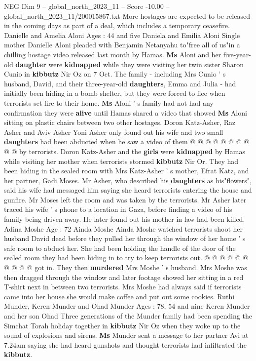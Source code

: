 \begin{textsample}{NEG Dim 9 – global\_north\_2023\_11 – Score -10.00 – global\_north\_2023\_11/200015867.txt}  \label{ex:f9_neg_064}
More hostages are expected to be released in the coming days as part of a deal, which includes a temporary ceasefire.
Danielle and Amelia Aloni Ages : 44 and five Daniela and Emilia Aloni Single mother Danielle Aloni pleaded with Benjamin Netanyahu to"free all of us"in a chilling hostage video released last month by Hamas. \textbf{Ms} Aloni and her five-year-old \textbf{daughter} were \textbf{kidnapped} while they were visiting her twin sister Sharon Cunio in \textbf{kibbutz} Nir Oz on 7 Oct.
The family - including Mrs Cunio ' s husband, David, and their three-year-old \textbf{daughters}, Emma and Julia - had initially been hiding in a bomb shelter, but they were forced to flee when terrorists set fire to their home. \textbf{Ms} Aloni ' s family had not had any confirmation they were \textbf{alive} until Hamas shared a video that showed \textbf{Ms} Aloni sitting on plastic chairs between two other hostages.
Doron Katz-Asher, Raz Asher and Aviv Asher Yoni Asher only found out his wife and two small \textbf{daughters} had been abducted when he saw a video of them @ @ @ @ @ @ @ @ @ @ by terrorists.
Doron Katz-Asher and the \textbf{girls} were \textbf{kidnapped} by Hamas while visiting her mother when terrorists stormed \textbf{kibbutz} Nir Or.
They had been hiding in the sealed room with Mrs Katz-Asher ' s mother, Efrat Katz, and her partner, Gadi Moses.
Mr Asher, who described his \textbf{daughters} as his"flowers", said his wife had messaged him saying she heard terrorists entering the house and gunfire.
Mr Moses left the room and was taken by the terrorists.
Mr Asher later traced his wife ' s phone to a location in Gaza, before finding a video of his family being driven away.
He later found out his mother-in-law had been killed.
Adina Moshe Age : 72 Ainda Moshe Ainda Moshe watched terrorists shoot her husband David dead before they pulled her through the window of her home ' s safe room to abduct her.
She had been holding the handle of the door of the sealed room they had been hiding in to try to keep terrorists out. @ @ @ @ @ @ @ @ @ @ got in.
They then \textbf{murdered} Mrs Moshe ' s husband.
Mrs Moshe was then dragged through the window and later footage showed her sitting in a red T-shirt next in between two terrorists.
Mrs Moshe had always said if terrorists came into her house she would make coffee and put out some cookies.
Ruthi Munder, Keren Munder and Ohad Munder Ages : 78, 54 and nine Keren Munder and her son Ohad Three generations of the Munder family had been spending the Simchat Torah holiday together in \textbf{kibbutz} Nir Oz when they woke up to the sound of explosions and sirens. \textbf{Ms} Munder sent a message to her partner Avi at 7.24am saying she had heard gunshots and thought terrorists had infiltrated the \textbf{kibbutz}.

\end{textsample}
